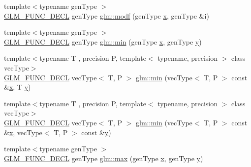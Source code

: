 \begin{DoxyCompactItemize}
\item 
{\footnotesize template$<$typename gen\+Type $>$ }\\\mbox{\hyperlink{setup_8hpp_ab2d052de21a70539923e9bcbf6e83a51}{G\+L\+M\+\_\+\+F\+U\+N\+C\+\_\+\+D\+E\+CL}} gen\+Type \mbox{\hyperlink{group__core__func__common_ga85e33f139b8db1b39b590a5713b9e679}{glm\+::modf}} (gen\+Type \mbox{\hyperlink{glad_8h_a92d0386e5c19fb81ea88c9f99644ab1d}{x}}, gen\+Type \&i)
\item 
{\footnotesize template$<$typename gen\+Type $>$ }\\\mbox{\hyperlink{setup_8hpp_ab2d052de21a70539923e9bcbf6e83a51}{G\+L\+M\+\_\+\+F\+U\+N\+C\+\_\+\+D\+E\+CL}} gen\+Type \mbox{\hyperlink{group__core__func__common_ga2c2bde1cec025b7ddff83c74a1113719}{glm\+::min}} (gen\+Type \mbox{\hyperlink{glad_8h_a92d0386e5c19fb81ea88c9f99644ab1d}{x}}, gen\+Type \mbox{\hyperlink{glad_8h_a66ddd433d2cacfe27f5906b7e86faeed}{y}})
\item 
{\footnotesize template$<$typename T , precision P, template$<$ typename, precision $>$ class vec\+Type$>$ }\\\mbox{\hyperlink{setup_8hpp_ab2d052de21a70539923e9bcbf6e83a51}{G\+L\+M\+\_\+\+F\+U\+N\+C\+\_\+\+D\+E\+CL}} vec\+Type$<$ T, P $>$ \mbox{\hyperlink{group__core__func__common_ga33e66cacf3e991ef1f7d0fce6d073ff9}{glm\+::min}} (vec\+Type$<$ T, P $>$ const \&\mbox{\hyperlink{glad_8h_a92d0386e5c19fb81ea88c9f99644ab1d}{x}}, T \mbox{\hyperlink{glad_8h_a66ddd433d2cacfe27f5906b7e86faeed}{y}})
\item 
{\footnotesize template$<$typename T , precision P, template$<$ typename, precision $>$ class vec\+Type$>$ }\\\mbox{\hyperlink{setup_8hpp_ab2d052de21a70539923e9bcbf6e83a51}{G\+L\+M\+\_\+\+F\+U\+N\+C\+\_\+\+D\+E\+CL}} vec\+Type$<$ T, P $>$ \mbox{\hyperlink{group__core__func__common_ga502b20a691e374cf42dea6e3d126d476}{glm\+::min}} (vec\+Type$<$ T, P $>$ const \&\mbox{\hyperlink{glad_8h_a92d0386e5c19fb81ea88c9f99644ab1d}{x}}, vec\+Type$<$ T, P $>$ const \&\mbox{\hyperlink{glad_8h_a66ddd433d2cacfe27f5906b7e86faeed}{y}})
\item 
{\footnotesize template$<$typename gen\+Type $>$ }\\\mbox{\hyperlink{setup_8hpp_ab2d052de21a70539923e9bcbf6e83a51}{G\+L\+M\+\_\+\+F\+U\+N\+C\+\_\+\+D\+E\+CL}} gen\+Type \mbox{\hyperlink{group__core__func__common_ga98caa7f95a94c86a86ebce893a45326c}{glm\+::max}} (gen\+Type \mbox{\hyperlink{glad_8h_a92d0386e5c19fb81ea88c9f99644ab1d}{x}}, gen\+Type \mbox{\hyperlink{glad_8h_a66ddd433d2cacfe27f5906b7e86faeed}{y}})

\end{DoxyCompactItemize}
